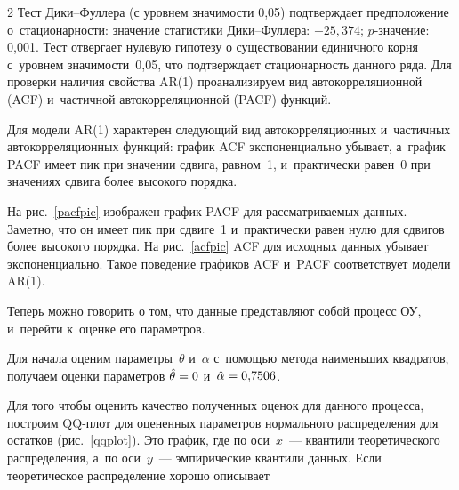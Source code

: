 \begin{multicols}{2}
Тест Дики--Фуллера (с уровнем зна\-чи\-мости 0,05) подтверждает предположение 
о~стационар\-ности: значение статистики Ди\-ки--Фул\-ле\-ра: $-25{,}374$; $p$-зна\-че\-ние: 
0,001. Тест  отвергает нулевую гипотезу о существовании единичного корня 
с~уровнем значимости~0,05, что подтверждает стационарность данного ряда.  Для 
проверки наличия свойства AR(1) проанализируем вид автокорреляционной (ACF) 
и~частичной автокорреляционной (PACF) функций.

         Для модели AR(1) характерен следующий вид автокорреляционных 
         и~частичных автокорреляционных функций: график ACF экспоненциально убывает, 
         а~график PACF имеет пик при значении сдвига, равном~1, и~практически равен~0 при 
значениях сдвига более высокого порядка.

       
       На рис.~\ref{pacfpic} изображен график PACF для рас\-смат\-ри\-ва\-емых данных. 
Заметно, что он имеет пик при сдвиге~1 и~практически равен нулю для сдвигов 
более высокого порядка.
        На рис.~\ref{acfpic} ACF для исходных данных убывает экспоненциально.
        Такое поведение графиков ACF и~PACF соответствует модели AR(1).

        Теперь можно говорить о том, что данные представляют собой процесс 
ОУ, и~перейти к~оценке его параметров.

        Для начала оценим параметры~$\theta$ и~$\alpha$ с~по\-мощью метода 
наименьших квадратов, получаем оценки параметров $\hat \theta \hm= 0$ и~$\hat \alpha 
\hm= 0{,}7506$.


        Для того чтобы оценить качество полученных оценок для данного процесса, 
построим QQ-плот для оцененных параметров нормального распределения для остатков 
(рис.~\ref{qqplot}). Это график, где по оси~$x$~--- квантили теоретического 
распределения, а~по оси~$y$~--- эмпирические квантили данных. Если теоретическое 
распределение хорошо описывает\linebreak\vspace*{-12pt}

\pagebreak

\end{multicols}

\begin{figure*} %
        \vspace*{1pt}
\begin{center}
\mbox{%
\epsfxsize=161.601mm
}
\end{center}
\vspace*{-11pt}
\label{qqplot}
\vspace*{-3pt}
\end{figure*}


